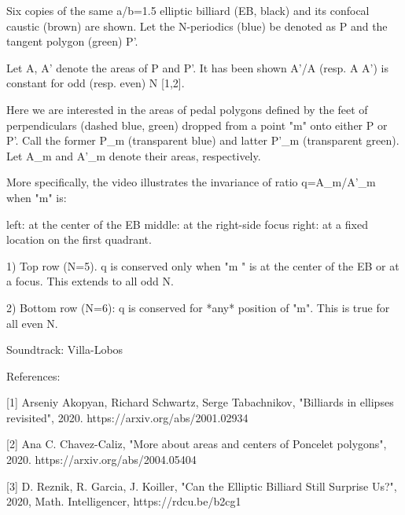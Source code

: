 Six copies of the same a/b=1.5 elliptic billiard (EB, black) and its confocal caustic (brown) are shown.  Let the N-periodics (blue) be denoted as P and the tangent polygon (green) P'.

Let A, A' denote the areas of P and P'. It has been shown A'/A (resp. A A') is constant for odd (resp. even) N [1,2].

Here we are interested in the areas of pedal polygons defined by the feet of perpendiculars (dashed blue, green) dropped from a point "m" onto either P or P'. Call the former P_m (transparent blue) and latter P'_m (transparent green). Let A_m and A'_m denote their areas, respectively. 

More specifically, the video illustrates the invariance of ratio q=A_m/A'_m when "m" is:

left: at the center of the EB
middle:  at the right-side focus
right: at a fixed location on the first quadrant. 

1) Top row (N=5). q is conserved only when "m " is at the center of the EB or at a focus. This extends to all odd N.
 
2) Bottom row (N=6): q is conserved for *any* position of "m". This is true for all even N.

Soundtrack: Villa-Lobos

References:

[1] Arseniy Akopyan, Richard Schwartz, Serge Tabachnikov, "Billiards in ellipses revisited", 2020. https://arxiv.org/abs/2001.02934

[2] Ana C. Chavez-Caliz, "More about areas and centers of Poncelet polygons", 2020. https://arxiv.org/abs/2004.05404

[3] D. Reznik, R. Garcia, J. Koiller, "Can the Elliptic Billiard Still Surprise Us?", 2020, Math. Intelligencer, https://rdcu.be/b2cg1